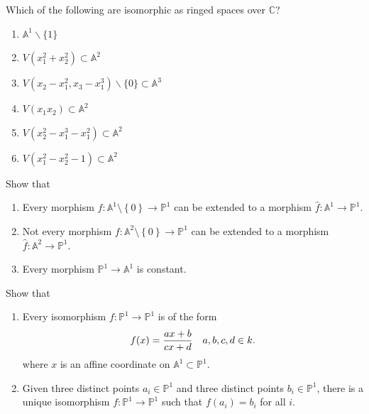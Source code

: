 \begin{exercise}[Gathmann 4.19]

Which of the following are isomorphic as ringed spaces over
\({\mathbb{C}}\)?

\begin{enumerate}
\def\labelenumi{(\alph{enumi})}
\item
  \(\mathbb{A}^{1} \backslash\{1\}\)
\item
  \(V\left(x_{1}^{2}+x_{2}^{2}\right) \subset \mathbb{A}^{2}\)
\item
  \(V\left(x_{2}-x_{1}^{2}, x_{3}-x_{1}^{3}\right) \backslash\{0\} \subset \mathbb{A}^{3}\)
\item
  \(V\left(x_{1} x_{2}\right) \subset \mathbb{A}^{2}\)
\item
  \(V\left(x_{2}^{2}-x_{1}^{3}-x_{1}^{2}\right) \subset \mathbb{A}^{2}\)
\item
  \(V\left(x_{1}^{2}-x_{2}^{2}-1\right) \subset \mathbb{A}^{2}\)
\end{enumerate}

\end{exercise}

\begin{exercise}[Gathmann 5.7]

Show that

\begin{enumerate}
\def\labelenumi{\alph{enumi}.}
\item
  Every morphism
  \(f:{\mathbb{A}}^1\setminus\left\{{0}\right\}\to {\mathbb{P}}^1\) can
  be extended to a morphism
  \(\widehat{f}: {\mathbb{A}}^1 \to {\mathbb{P}}^1\).
\item
  Not every morphism
  \(f:{\mathbb{A}}^2\setminus\left\{{0}\right\}\to {\mathbb{P}}^1\) can
  be extended to a morphism
  \(\widehat{f}: {\mathbb{A}}^2 \to {\mathbb{P}}^1\).
\item
  Every morphism \({\mathbb{P}}^1\to {\mathbb{A}}^1\) is constant.
\end{enumerate}

\end{exercise}

\begin{exercise}[Gathmann 5.8]

Show that

\begin{enumerate}
\def\labelenumi{\alph{enumi}.}
\item
  Every isomorphism \(f:{\mathbb{P}}^1\to {\mathbb{P}}^1\) is of the
  form
  \begin{align*}  
  f(x) = {ax+b \over cx+d} && a,b,c,d\in k
  .\end{align*}
  where \(x\) is an affine coordinate on
  \({\mathbb{A}}^1\subset {\mathbb{P}}^1\).
\item
  Given three distinct points \(a_i \in {\mathbb{P}}^1\) and three
  distinct points \(b_i \in {\mathbb{P}}^1\), there is a unique
  isomorphism \(f:{\mathbb{P}}^1 \to {\mathbb{P}}^1\) such that
  \(f(a_i) = b_i\) for all \(i\).
\end{enumerate}

\end{exercise}

